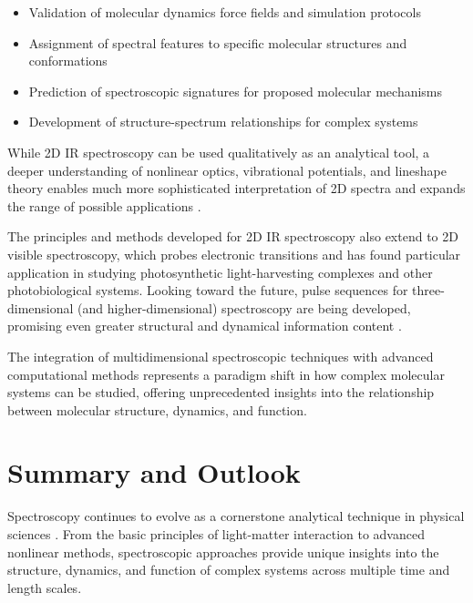 	\begin{itemize}
		\item Validation of molecular dynamics force fields and simulation protocols
		\item Assignment of spectral features to specific molecular structures and conformations
		\item Prediction of spectroscopic signatures for proposed molecular mechanisms
		\item Development of structure-spectrum relationships for complex systems
	\end{itemize}

	\noindent While 2D IR spectroscopy can be used qualitatively as an analytical tool, a deeper understanding of nonlinear optics, vibrational potentials, and lineshape theory enables much more sophisticated interpretation of 2D spectra and expands the range of possible applications \cite{hammzanni2011conceptsmethods2d}.

	\noindent The principles and methods developed for 2D IR spectroscopy also extend to 2D visible spectroscopy, which probes electronic transitions and has found particular application in studying photosynthetic light-harvesting complexes and other photobiological systems. Looking toward the future, pulse sequences for three-dimensional (and higher-dimensional) spectroscopy are being developed, promising even greater structural and dynamical information content \cite{hammzanni2011conceptsmethods2d}.

	\noindent The integration of multidimensional spectroscopic techniques with advanced computational methods represents a paradigm shift in how complex molecular systems can be studied, offering unprecedented insights into the relationship between molecular structure, dynamics, and function.


	\section{Summary and Outlook}
	\label{sec:summary}

	\noindent Spectroscopy continues to evolve as a cornerstone analytical technique in physical sciences \cite{mukamel1995principlesnonlinearoptical, cho2009twodimensionalopticalspectroscopy}. From the basic principles of light-matter interaction to advanced nonlinear methods, spectroscopic approaches provide unique insights into the structure, dynamics, and function of complex systems across multiple time and length scales.

